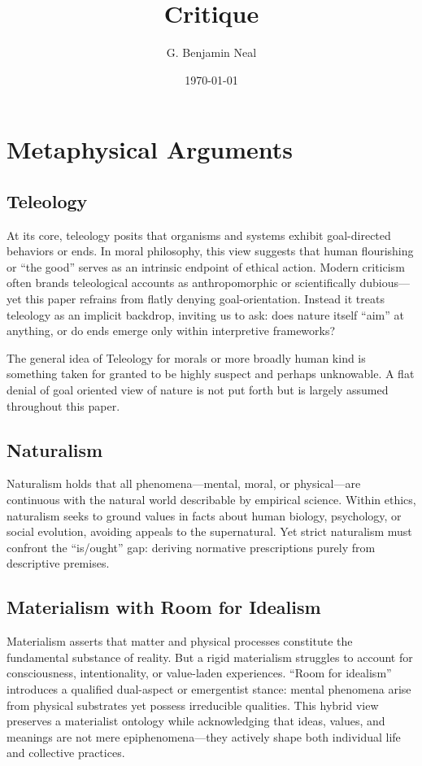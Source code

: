 \documentclass[a4paper]{article}
\begin{document}
\title{Critique}
\author{G. Benjamin Neal}
\date{\today}
\maketitle

\begin{abstract}
\end{abstract}

\section{Metaphysical Arguments}
\subsection{Teleology}
At its core, teleology posits that organisms and systems exhibit goal-directed behaviors or ends. 
In moral philosophy, this view suggests that human flourishing or “the good” serves as an intrinsic endpoint of ethical action. 
Modern criticism often brands teleological accounts as anthropomorphic or scientifically dubious—yet this paper refrains from flatly denying goal-orientation. 
Instead it treats teleology as an implicit backdrop, inviting us to ask: does nature itself “aim” at anything, or do ends emerge only within interpretive frameworks?

The general idea of Teleology for morals or more broadly human kind is something taken for granted to be highly suspect and perhaps unknowable.
A flat denial of goal oriented view of nature is not put forth but is largely assumed throughout this paper.

\subsection{Naturalism}
Naturalism holds that all phenomena—mental, moral, or physical—are continuous with the natural world describable by empirical science. 
Within ethics, naturalism seeks to ground values in facts about human biology, psychology, or social evolution, avoiding appeals to the supernatural. 
Yet strict naturalism must confront the “is/ought” gap: deriving normative prescriptions purely from descriptive premises. 


\subsection{Materialism with Room for Idealism}
Materialism asserts that matter and physical processes constitute the fundamental substance of reality. 
But a rigid materialism struggles to account for consciousness, intentionality, or value-laden experiences. 
“Room for idealism” introduces a qualified dual-aspect or emergentist stance: mental phenomena arise from physical substrates yet possess irreducible qualities. 
This hybrid view preserves a materialist ontology while acknowledging that ideas, values, and meanings are not mere epiphenomena—they actively shape both individual life and collective practices.
\end{document}

